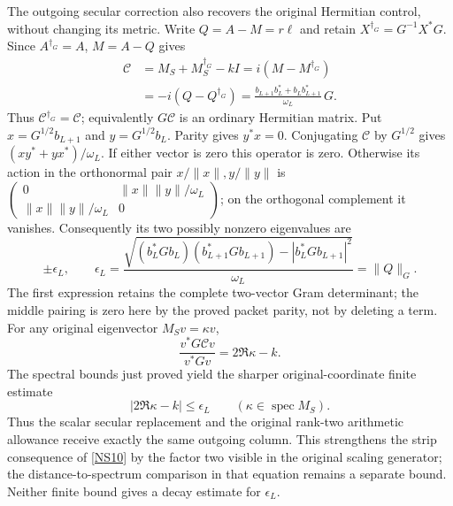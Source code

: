 \documentclass[11pt]{article}
\begin{document}
The outgoing secular correction also recovers the
original Hermitian control, without changing its
metric. Write $Q=A-M=r\ell$ and retain
$X^{\dagger_G}=G^{-1}X^*G$. Since $A^{\dagger_G}=A$,
$M=A-Q$ gives
\begin{equation}\tag{NS35}\label{NS35}
\begin{split}
\mathcal C
&=M_S+M_S^{\dagger_G}-kI
=i(M-M^{\dagger_G})\\
&=-i(Q-Q^{\dagger_G})
=\frac{b_{L+1}b_L^*+b_Lb_{L+1}^*}{\omega_L}\,G .
\end{split}
\end{equation}
Thus $\mathcal C^{\dagger_G}=\mathcal C$; equivalently
$G\mathcal C$ is an ordinary Hermitian matrix.
Put $x=G^{1/2}b_{L+1}$ and $y=G^{1/2}b_L$.
Parity gives $y^*x=0$. Conjugating $\mathcal C$ by
$G^{1/2}$ gives $(xy^*+yx^*)/\omega_L$.
If either vector is zero this operator is zero.
Otherwise its action in the orthonormal pair
$x/\|x\|,y/\|y\|$ is
$\left(\begin{smallmatrix}0&\|x\|\|y\|/\omega_L\\
\|x\|\|y\|/\omega_L&0\end{smallmatrix}\right)$;
on the orthogonal complement it vanishes. Consequently
its two possibly nonzero eigenvalues are
\begin{equation}\tag{NS36}\label{NS36}
\pm\epsilon_L,\qquad
\epsilon_L=
\frac{\sqrt{(b_L^*Gb_L)(b_{L+1}^*Gb_{L+1})
                 -|b_L^*Gb_{L+1}|^2}}{\omega_L}
=\|Q\|_G .
\end{equation}
The first expression retains the complete two-vector
Gram determinant; the middle pairing is zero here
by the proved packet parity, not by deleting a term.
For any original eigenvector $M_Sv=\kappa v$,
\[
\frac{v^*G\mathcal C v}{v^*Gv}=2\Re\kappa-k.
\]
The spectral bounds just proved yield the sharper
original-coordinate finite estimate
\begin{equation}\tag{NS37}\label{NS37}
|2\Re\kappa-k|\leq\epsilon_L
\qquad(\kappa\in\operatorname{spec}M_S).
\end{equation}
Thus the scalar secular replacement and the original
rank-two arithmetic allowance receive exactly the
same outgoing column. This strengthens the strip
consequence of \eqref{NS10} by the factor two
visible in the original scaling generator; the
distance-to-spectrum comparison in that equation
remains a separate bound. Neither
finite bound gives a decay estimate for $\epsilon_L$.
\end{document}
